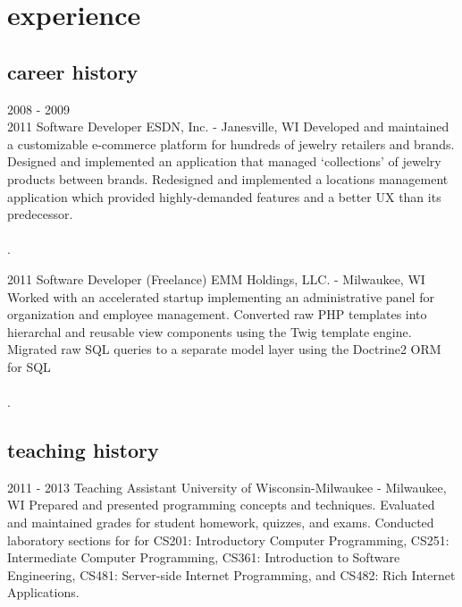 \documentclass[]{fritz-resume}
\begin{document}

\section{experience}

\subsection{career history}

\begin{entrylist}
  \entry
    {2008 - 2009 \\ 2011}
    {Software Developer}
    {ESDN, Inc. - Janesville, WI}
    {
      Developed and maintained a customizable e-commerce platform for hundreds of jewelry retailers and brands. Designed and implemented an application that managed `collections' of jewelry products between brands. Redesigned and implemented a locations management application which provided highly-demanded features and a better UX than its predecessor. \\\\ .
    }

  \entry
    {2011}
    {Software Developer (Freelance)}
    {EMM Holdings, LLC. - Milwaukee, WI}
    {
      Worked with an accelerated startup implementing an administrative panel for organization and employee management. Converted raw PHP templates into hierarchal and reusable view components using the Twig template engine. Migrated raw SQL queries to a separate model layer using the Doctrine2 ORM for SQL\\\\ .
    }
\end{entrylist}

\subsection{teaching history}

\begin{entrylist}
  \entry
    {2011 - 2013}
    {Teaching Assistant}
    {University of Wisconsin-Milwaukee - Milwaukee, WI}
    {
      Prepared and presented programming concepts and techniques. Evaluated and maintained grades for student homework, quizzes, and exams. Conducted laboratory sections for for CS201: Introductory Computer Programming, CS251: Intermediate Computer Programming, CS361: Introduction to Software Engineering, CS481: Server-side Internet Programming, and CS482: Rich Internet Applications.
    }
\end{entrylist}
\end{document}
